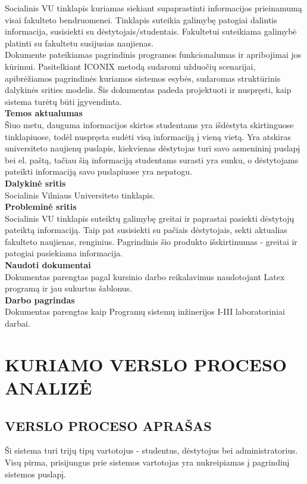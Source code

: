 \documentclass{VUMIFPSkursinis}
\begin{document}
Socialinis VU tinklapis kuriamas siekiant supaprastinti informacijos prieinamumą visai fakulteto bendruomenei. Tinklapis suteikia galimybę patogiai dalintis informacija, susisiekti su dėstytojais/studentais. Fakultetui suteikiama galimybė platinti su fakultetu susijusias naujienas. \\
Dokumente pateikiamas pagrindinis programos funkcionalumas ir apribojimai jos
kūrimui. Pasitelkiant ICONIX metodą sudaromi užduočių scenarijai, apibrėžiamos pagrindinės
kuriamos sistemos esybės, sudaromas struktūrinis dalykinės srities modelis. Šis dokumentas
padeda projektuoti ir nuspręsti, kaip sistema turėtų būti įgyvendinta.\\
\textbf{Temos aktualumas} \\
Šiuo metu, dauguma informacijos skirtos studentams yra išdėstyta skirtinguose tinklapiuose, todėl nuspręsta sudėti visą informaciją į vieną vietą. Yra atskiras universiteto naujienų puslapis, kiekvienas dėstytojas turi savo asmenininį puslapį bei el. paštą, tačiau šią informaciją studentams surasti yra sunku, o dėstytojams pateikti informaciją savo puslapiuose yra nepatogu.\\
\textbf{Dalykinė sritis}\\
Socialinis Vilniaus Universiteto tinklapis.\\
 \textbf{Probleminė sritis}\\
Socialinis VU tinklapis suteiktų galimybę greitai ir paprastai pasiekti dėstytojų pateiktą informaciją. Taip pat susisiekti su pačiais dėstytojais, sekti aktualias fakulteto naujienas, renginius. Pagrindinis šio produkto išskirtinumas - greitai ir patogiai pasiekiama informacija.\\
 \textbf{Naudoti dokumentai}\\
 Dokumentas parengtas pagal kursinio darbo reikalavimus naudotojant Latex programą ir jau
sukurtus šablonus.
\\
 \textbf{Darbo pagrindas} \\ 
Dokumentas parengtas kaip Programų sistemų inžinerijos I-III laboratoriniai darbai.
\newpage
\section{KURIAMO VERSLO PROCESO ANALIZĖ}
\subsection{VERSLO PROCESO APRAŠAS}

Ši sistema turi trijų tipų vartotojus - studentus, dėstytojus bei administratorius. Visų pirma, prisijungus prie sistemos vartotojas yra nukreipiamas į pagrindinį sistemos puslapį.
\end{document}
